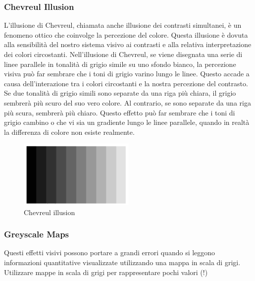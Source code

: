 \subsubsection{Chevreul Illusion}

L'illusione di Chevreul, chiamata anche illusione dei contrasti simultanei, è un fenomeno ottico che coinvolge la percezione del colore. Questa illusione è dovuta alla sensibilità del nostro sistema visivo ai contrasti e alla relativa interpretazione dei colori circostanti.
Nell'illusione di Chevreul, se viene disegnata una serie di linee parallele in tonalità di grigio simile su uno sfondo bianco, la percezione visiva può far sembrare che i toni di grigio varino lungo le linee. Questo accade a causa dell'interazione tra i colori circostanti e la nostra percezione del contrasto.
Se due tonalità di grigio simili sono separate da una riga più chiara, il grigio sembrerà più scuro del suo vero colore. Al contrario, se sono separate da una riga più scura, sembrerà più chiaro. Questo effetto può far sembrare che i toni di grigio cambino o che vi sia un gradiente lungo le linee parallele,
quando in realtà la differenza di colore non esiste realmente.
 \begin{figure}[H]
    \centering
    \includegraphics[width=0.5\textwidth]{images/Chevr.png} 
    \caption{Chevreul illusion}
    \label{fig:immagine}
\end{figure}
 \subsubsection{Greyscale Maps}
Questi effetti visivi possono portare a grandi errori quando si leggono informazioni quantitative visualizzate utilizzando una mappa in scala di grigi.
Utilizzare mappe in scala di grigi per rappresentare pochi valori (!)

